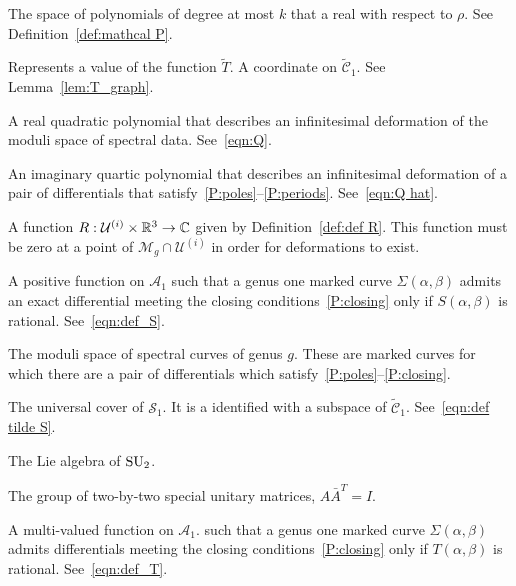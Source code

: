 \begin{description}[align=right]
\item[$\mathcal{P}^k_\R$] The space of polynomials of degree at most $k$ that a real with respect to $ρ$. See Definition~\ref{def:mathcal P}.

\item[$q$] Represents a value of the function $\tilde{T}$. A coordinate on $\mathcal{\tilde{C}}_1$. See Lemma~\ref{lem:T_graph}.

\item[$Q$] A real quadratic polynomial that describes an infinitesimal deformation of the moduli space of spectral data. See~\eqref{eqn:Q}.

\item[$\hat{Q}$] An imaginary quartic polynomial that describes an infinitesimal deformation of a pair of differentials that satisfy~\ref{P:poles}--\ref{P:periods}. See~\eqref{eqn:Q hat}.

\item[$R$] A function $R : \mathcal{U}^{(i)} \times \R^3 \to \C$ given by Definition~\ref{def:def R}. This function must be zero at a point of $\mathcal{M}_g \cap \mathcal{U}^{(i)}$ in order for deformations to exist.

\item[$S$] A positive function on $\mathcal{A}_1$ such that a genus one marked curve $Σ(α,β)$ admits an exact differential meeting the closing conditions~\ref{P:closing} only if $S(α,β)$ is rational. See~\eqref{eqn:def_S}.

\item[$\mathcal{S}_g$] The moduli space of spectral curves of genus $g$. These are marked curves for which there are a pair of differentials which satisfy~\ref{P:poles}--\ref{P:closing}.

\item[$\mathcal{\tilde{S}}_1$] The universal cover of $\mathcal{S}_1$. It is a identified with a subspace of $\mathcal{\tilde{C}}_1$. See~\eqref{eqn:def tilde S}.

\item[$\su_2$] The Lie algebra of $\SU_2$.

\item[$\SU_2$] The group of two-by-two special unitary matrices, $A \bar{A}^T = I$.

\item[$T$] A multi-valued function on $\mathcal{A}_1$. such that a genus one marked curve $Σ(α,β)$ admits differentials meeting the closing conditions~\ref{P:closing} only if $T(α,β)$ is rational. See~\eqref{eqn:def_T}.


\end{description}
